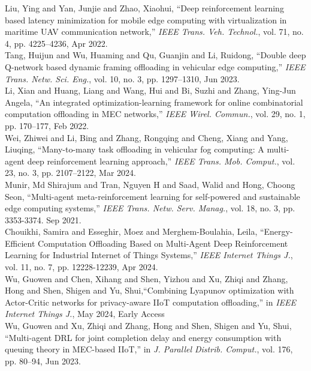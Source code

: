 \documentclass[12pt,draftclsnofoot,onecolumn]{IEEEtran}
\newcommand{\rev}[1]{{\color{blue}#1}} %
\newcommand{\rev}[1]{#1}
\newenvironment{my}[2]%
{\begin{list}{}%
{\setlength{\rightmargin}{#1}\setlength{\leftmargin}{#2}}%


 \item[]{}

} {\end{list}}
\begin{document}
\begin{enumerate}
		\begin{my}{1cm}{1cm}
	\rev{
		{\small
			\noindent\hspace{-0.1mm}\cite{liu2022deep} Liu, Ying and Yan, Junjie and Zhao, Xiaohui, ``Deep reinforcement learning based latency minimization for mobile edge computing with virtualization in maritime UAV communication network,'' \textit{IEEE Trans. Veh. Technol.}, vol. 71, no. 4, pp. 4225--4236, Apr 2022.\\[6pt]
			\cite{tang2022double} Tang, Huijun and Wu, Huaming and Qu, Guanjin and Li, Ruidong, ``Double deep Q-network based dynamic framing offloading in vehicular edge computing,'' \textit{IEEE Trans. Netw. Sci. Eng.}, vol. 10, no. 3, pp. 1297--1310, Jun 2023.\\[6pt]
			\cite{li2022integrated} Li, Xian and Huang, Liang and Wang, Hui and Bi, Suzhi and Zhang, Ying-Jun Angela, ``An integrated optimization-learning framework for online combinatorial computation offloading in MEC networks,'' \textit{IEEE Wirel. Commun.}, vol. 29, no. 1, pp. 170--177, Feb 2022.\\[6pt]
			\cite{wei2023many} Wei, Zhiwei and Li, Bing and Zhang, Rongqing and Cheng, Xiang and Yang, Liuqing, ``Many-to-many task offloading in vehicular fog computing: A multi-agent deep reinforcement learning approach,'' \textit{IEEE Trans. Mob. Comput.}, vol. 23, no. 3, pp. 2107--2122, Mar 2024.\\[6pt]
			\cite{munir2021multi} Munir, Md Shirajum and Tran, Nguyen H and Saad, Walid and Hong, Choong Seon, ``Multi-agent meta-reinforcement learning for self-powered and sustainable edge computing systems,'' \textit{IEEE Trans. Netw. Serv. Manag.}, vol. 18, no. 3, pp. 3353-3374. Sep 2021.\\[6pt]
			\cite{chouikhi2023energy} Chouikhi, Samira and Esseghir, Moez and Merghem-Boulahia, Leila, ``Energy-Efficient Computation Offloading Based on Multi-Agent Deep Reinforcement Learning for Industrial Internet of Things Systems,'' \textit{IEEE Internet Things J.}, vol. 11, no. 7, pp. 12228-12239, Apr 2024.\\[6pt]
			\cite{wu2024combining} Wu, Guowen and Chen, Xihang and Shen, Yizhou and Xu, Zhiqi and Zhang, Hong and Shen, Shigen and Yu, Shui,``Combining Lyapunov optimization with Actor-Critic networks for privacy-aware IIoT computation offloading,'' in \textit{IEEE Internet Things J.}, May 2024, Early Access\\[6pt]
			\cite{wu2023multi} Wu, Guowen and Xu, Zhiqi and Zhang, Hong and Shen, Shigen and Yu, Shui,  ``Multi-agent DRL for joint completion delay and energy consumption with queuing theory in MEC-based IIoT,'' in \textit{J. Parallel Distrib. Comput.}, vol. 176, pp. 80–94, Jun 2023.\\[6pt]
}}
\end{my}
\end{enumerate}
\end{document}
